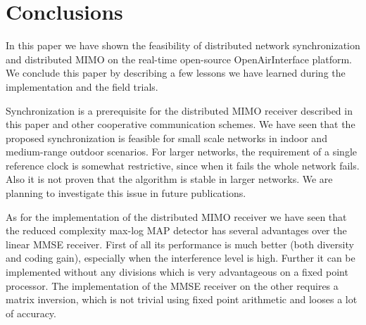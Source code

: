 \documentclass[a4paper,twocolumn,journal]{IEEEtran}
\begin{document}


% 


\section{Conclusions}
\label{sec:con}

In this paper we have shown the feasibility of distributed network synchronization and distributed MIMO on the real-time open-source OpenAirInterface platform. We conclude this paper by describing a few lessons we have learned during the implementation and the field trials. 

Synchronization is a prerequisite for the distributed MIMO receiver described in this paper and other cooperative communication schemes. We have seen that the proposed synchronization is feasible for small scale networks in indoor and medium-range outdoor scenarios. For larger networks, the requirement of a single reference clock is somewhat restrictive, since when it fails the whole network fails. Also it is not proven that the algorithm is stable in larger networks. We are planning to investigate this issue in future publications.

As for the implementation of the distributed MIMO receiver we have seen that the reduced complexity max-log MAP detector has several advantages over the linear MMSE receiver. First of all its performance is much better (both diversity and coding gain), especially when the interference level is high. Further it can be implemented without any divisions which is very advantageous on a fixed point processor. The implementation of the MMSE receiver on the other requires a matrix inversion, which is not trivial using fixed point arithmetic and looses a lot of accuracy.    
\end{document}

